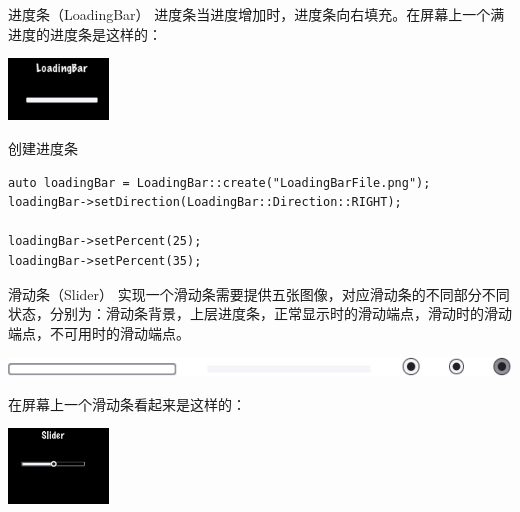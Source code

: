 \documentclass{beamer}
\begin{document}

\begin{frame}[fragile]{进度条（LoadingBar）}
进度条当进度增加时，进度条向右填充。在屏幕上一个满进度的进度条是这样的：

\vspace{1em}

\includegraphics[width=0.2\textwidth]
{figures/loading_bar}

\vspace{1em}

\begin{block}{创建进度条}
\begin{verbatim}
auto loadingBar = LoadingBar::create("LoadingBarFile.png");
loadingBar->setDirection(LoadingBar::Direction::RIGHT);

loadingBar->setPercent(25);
loadingBar->setPercent(35);
\end{verbatim}
\end{block}
\end{frame}


\begin{frame}[fragile]{滑动条（Slider）}
实现一个滑动条需要提供五张图像，对应滑动条的不同部分不同状态，分别为：滑动条背景，上层进度条，正常显示时的滑动端点，滑动时的滑动端点，不可用时的滑动端点。

\vspace{1em}

\includegraphics[width=\textwidth]
{figures/slider_status}

\vspace{1em}

在屏幕上一个滑动条看起来是这样的：

\vspace{1em}

\includegraphics[width=0.2\textwidth]
{figures/slider}
\end{frame}
\end{document}
